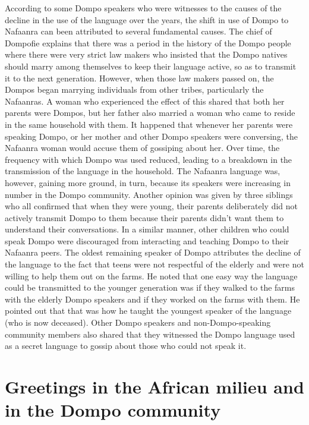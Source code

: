 \documentclass[output=paper,colorlinks,citecolor=brown]{langscibook}
\begin{document}
According to some Dompo speakers who were witnesses to the causes of the decline in the use of the language over the years, the shift in use of Dompo to Nafaanra can been attributed to several fundamental causes. The chief of Dompofie explains that there was a period in the history of the Dompo people where there were very strict law makers who insisted that the Dompo natives should marry among themselves to keep their language active, so as to transmit it to the next generation. However, when those law makers passed on, the Dompos began marrying individuals from other tribes, particularly the Nafaanras. A woman who experienced the effect of this shared that both her parents were Dompos, but her father also married a  woman who came to reside in the same household with them. It happened that whenever her parents were speaking Dompo, or her mother and other Dompo speakers were conversing, the Nafaanra woman would accuse them of gossiping about her. Over time, the frequency with which Dompo was used reduced, leading to a breakdown in the transmission of the language in the household. The Nafaanra language was, however, gaining more ground, in turn, because its speakers were increasing in number in the Dompo community. Another opinion was given by three siblings who all confirmed that when they were young, their parents deliberately did not actively transmit Dompo to them because their parents didn’t want them to understand their conversations. In a similar manner, other children who could speak Dompo were discouraged  from interacting and teaching Dompo to their Nafaanra peers. The oldest remaining speaker of Dompo attributes the decline of the language to the fact that teens were not respectful of the elderly and were not willing to help them out on the farms. He noted that one easy way the language could be transmitted to the younger generation was if they walked to the farms with the elderly Dompo speakers and if they worked on the farms with them. He pointed out that that was how he taught the youngest speaker of the language (who is now deceased). Other Dompo speakers and non-Dompo-speaking community members also shared that they witnessed the Dompo language used as a secret language to gossip about those who could not speak it.

\section{Greetings in the African milieu and in the Dompo community}
\end{document}

